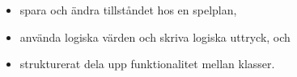 \begin{Datorarbete}
\begin{itemize}
		\item spara och ändra tillståndet hos en spelplan,
		
		\item använda logiska värden och skriva logiska uttryck, och
		
		\item strukturerat dela upp funktionalitet mellan klasser.
	\end{itemize}
	
\end{Datorarbete}
